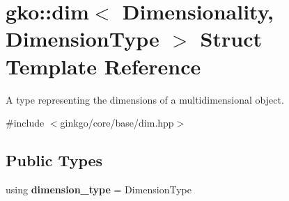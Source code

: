 \hypertarget{structgko_1_1dim}{}\section{gko\+:\+:dim$<$ Dimensionality, Dimension\+Type $>$ Struct Template Reference}
\label{structgko_1_1dim}


A type representing the dimensions of a multidimensional object.  




{\ttfamily \#include $<$ginkgo/core/base/dim.\+hpp$>$}

\subsection*{Public Types}
\begin{DoxyCompactItemize}
\item 
\mbox{\label{structgko_1_1dim_a014dcfcbc2b4a8dad05d417d110711c7}} 
using {\bfseries dimension\+\_\+type} = Dimension\+Type
\end{DoxyCompactItemize}

